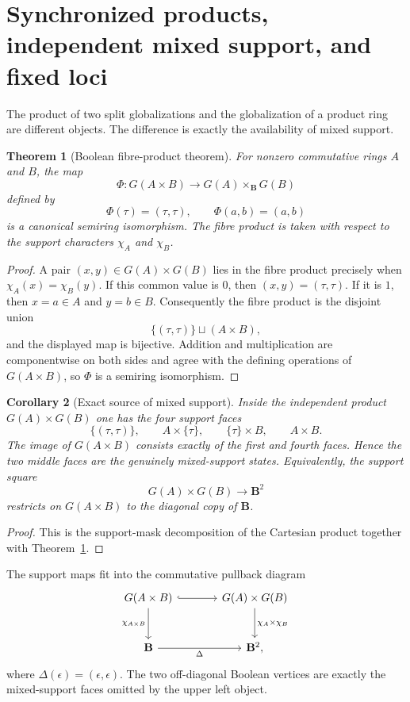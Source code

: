 \documentclass[11pt]{amsart}
\numberwithin{equation}{section}
\newtheorem{theorem}{Theorem}[section]
\newtheorem{corollary}[theorem]{Corollary}
\theoremstyle{definition}
\newcommand{\B}{\mathbf B}
\begin{document}
\section{Synchronized products, independent mixed support, and fixed loci}
\label{sec:synchronized-products}

The product of two split globalizations and the globalization of a product
ring are different objects.  The difference is exactly the availability of
mixed support.

\begin{theorem}[Boolean fibre-product theorem]
\label{thm:boolean-fibre-product}
For nonzero commutative rings $A$ and $B$, the map
\[
\Phi:G(A\times B)\longrightarrow G(A)\times_{\B}G(B)
\]
defined by
\[
\Phi(\tau)=(\tau,\tau),
\qquad
\Phi(a,b)=(a,b)
\]
is a canonical semiring isomorphism.  The fibre product is taken with
respect to the support characters $\chi_A$ and $\chi_B$.
\end{theorem}

\begin{proof}
A pair $(x,y)\in G(A)\times G(B)$ lies in the fibre product precisely when
$\chi_A(x)=\chi_B(y)$.  If this common value is $0$, then
$(x,y)=(\tau,\tau)$.  If it is $1$, then $x=a\in A$ and $y=b\in B$.
Consequently the fibre product is the disjoint union
\[
\{(\tau,\tau)\}\sqcup(A\times B),
\]
and the displayed map is bijective.  Addition and multiplication are
componentwise on both sides and agree with the defining operations of
$G(A\times B)$, so $\Phi$ is a semiring isomorphism.
\end{proof}

\begin{corollary}[Exact source of mixed support]
\label{cor:mixed-support-source}
Inside the independent product $G(A)\times G(B)$ one has the four support
faces
\[
\{(\tau,\tau)\},\qquad A\times\{\tau\},\qquad
\{\tau\}\times B,\qquad A\times B.
\]
The image of $G(A\times B)$ consists exactly of the first and fourth
faces.  Hence the two middle faces are the genuinely mixed-support states.
Equivalently, the support square
\[
G(A)\times G(B)\longrightarrow\B^2
\]
restricts on $G(A\times B)$ to the diagonal copy of $\B$.
\end{corollary}

\begin{proof}
This is the support-mask decomposition of the Cartesian product together
with Theorem~\ref{thm:boolean-fibre-product}.
\end{proof}

The support maps fit into the commutative pullback diagram
\[
\begin{tikzcd}[column sep=large,row sep=large]
G(A\times B) \arrow[r,hook] \arrow[d,"\chi_{A\times B}"']
& G(A)\times G(B) \arrow[d,"\chi_A\times\chi_B"]\\
\B \arrow[r,"\Delta"'] & \B^2,
\end{tikzcd}
\]
where $\Delta(\epsilon)=(\epsilon,\epsilon)$.  The two off-diagonal
Boolean vertices are exactly the mixed-support faces omitted by the upper
left object.
\end{document}
